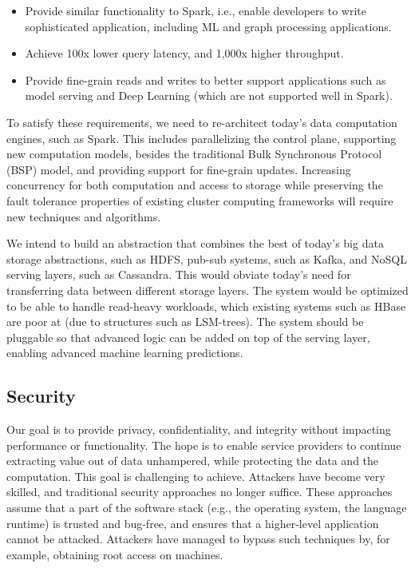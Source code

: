 \begin{itemize}[noitemsep,topsep=0pt,parsep=0pt,partopsep=0pt]
\item Provide similar functionality to Spark, i.e., enable developers to write sophisticated application, including ML and graph processing applications.
\item Achieve 100x lower query latency, and 1,000x higher throughput.
\item Provide fine-grain reads and writes to better support applications such as model serving and Deep Learning (which are not supported well in Spark).
\end{itemize}

To satisfy these requirements, we need to re-architect today's data computation engines, such as Spark. This includes parallelizing the control plane, supporting new computation models, besides the traditional Bulk Synchronous Protocol (BSP) model, and providing support for fine-grain updates. Increasing concurrency for both computation and access to storage while preserving the fault tolerance properties of existing cluster computing frameworks will require new techniques and algorithms.

We intend to build an abstraction that combines the best of today's big data storage abstractions, such as HDFS, pub-sub systems, such as Kafka, and NoSQL serving layers, such as Cassandra. This would obviate today's need for transferring data between different storage layers. The system would be optimized to be able to handle read-heavy workloads, which existing systems such as HBase are poor at (due to structures such as LSM-trees). The system should be pluggable so that advanced logic can be added on top of the serving layer, enabling advanced machine learning predictions. 

\subsection{Security} 

Our goal is to provide privacy, confidentiality, and integrity without impacting performance or functionality. The hope is to enable service providers to continue extracting value out of data unhampered, while protecting the data and the computation. This goal is challenging to achieve. Attackers have become very skilled, and traditional security approaches no longer suffice. These approaches assume that a part of the software stack (e.g., the operating system, the language runtime) is trusted and bug-free, and ensures that a higher-level application cannot be attacked. Attackers have managed to bypass such techniques by, for example, obtaining root access on machines.

